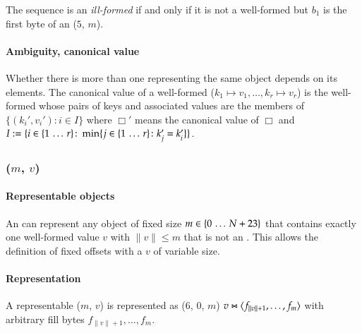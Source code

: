 The sequence is an \emph{ill-formed} \DborDictionaryValue{} if and only if it is not a well-formed
\DborDictionaryValue{} but $b_1$ is the first byte of an \DborIntegerToken*($5$, $m$).


\paragraph{Ambiguity, canonical value}

Whether there is more than one \DborDictionaryValue{} representing the same object depends on its elements.
The canonical value of a well-formed \DborDictionaryValue($k_1 \mapsto v_1, \ldots, k_r \mapsto v_r$) is
the well-formed \DborDictionaryValue{} whose pairs of keys and associated values are the members of
$\{(k_i', v_i') \colon i \in I\}$ where $\Box'$ means the canonical value of $\Box$ and
$I := \{i \in \{1 \,\ldots\, r\}\colon \min\{j \in \{1 \,\ldots\, r\}\colon k_j' = k_i'\}\}$.


\subsubsection{\DborAllocatedValue(\texorpdfstring{$m$, $v$}{m, v})}
\hypertarget{sec:def:AllocatedValue}{}

\paragraph{Representable objects}

An \DborAllocatedValue{} can represent any object of fixed size $m \in \{0 \,\ldots\, N + 23\}$
that contains exactly one well-formed value $v$ with $\|v\| \le m$ that is not an \DborAllocatedValue.
This allows the definition of fixed offsets with a $v$ of variable size.

\paragraph{Representation}

A representable \DborAllocatedValue($m$, $v$) is represented as
\DborNaturalToken*($6$, $0$, $m$) {\Concat} $v \Concat \ByteSequence{f_{\|v\| + 1}, \ldots, f_m}$
with arbitrary fill bytes $f_{\|v\| + 1}, \ldots, f_m$.

